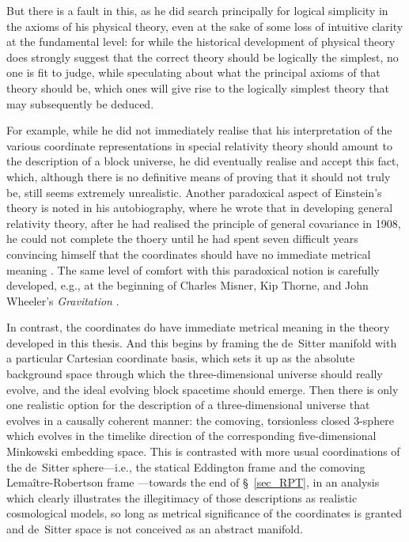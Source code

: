 But there is a fault in this, as he did search principally for logical simplicity in the axioms of his physical theory, even at the sake of some loss of intuitive clarity at the fundamental level: for while the historical development of physical theory does strongly suggest that the correct theory should be logically the simplest, no one is fit to judge, while speculating about what the principal axioms of that theory should be, which ones will give rise to the logically simplest theory that may subsequently be deduced.

For example, while he did not immediately realise that his interpretation of the various coordinate representations in special relativity theory should amount to the description of a block universe, he did eventually realise and accept this fact, which, although there is no definitive means of proving that it should not truly be, still seems extremely unrealistic. Another paradoxical aspect of Einstein's theory is noted in his autobiography, where he wrote that in developing general relativity theory, after he had realised the principle of general covariance in 1908, he could not complete the thoery until he had spent seven difficult years convincing himself that the coordinates should have no immediate metrical meaning \cite{Einstein1951}. The same level of comfort with this paradoxical notion is carefully developed, e.g., at the beginning of Charles Misner, Kip Thorne, and John Wheeler's \textit{Gravitation} \cite{Misner1973}.

In contrast, the coordinates do have immediate metrical meaning in the theory developed in this thesis. And this begins by framing the de~Sitter manifold with a particular Cartesian coordinate basis, which sets it up as the absolute background space through which the three-dimensional universe should really evolve, and the ideal evolving block spacetime should emerge. Then there is only one realistic option for the description of a three-dimensional universe that evolves in a causally coherent manner: the comoving, torsionless closed 3-sphere which evolves in the timelike direction of the corresponding five-dimensional Minkowski embedding space. This is contrasted with more usual coordinations of the de~Sitter sphere---i.e., the statical Eddington frame \cite{Eddington1923} and the comoving Lema\^{i}tre-Robertson frame \cite{Lemaitre1925b,Robertson1928}---towards the end of \S~\ref{sec_RPT}, in an analysis which clearly illustrates the illegitimacy of those descriptions as realistic cosmological models, so long as metrical significance of the coordinates is granted and de~Sitter space is not conceived as an abstract manifold.

